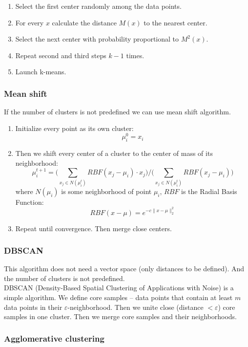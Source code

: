 \begin{enumerate}
	\item Select the first center randomly among the data points.
	\item For every $x$ calculate the distance $M(x)$ to the nearest center.
	\item Select the next center with probability proportional to $M^2(x)$.
	\item Repeat second and third steps $k-1$ times.
	\item Launch k-means.
\end{enumerate}

\subsubsection{Mean shift}

If the number of clusters is not predefined we can use mean shift algorithm.
\begin{enumerate}
	\item Initialize every point as its own cluster: $$\mu_i^0=x_i$$
	\item Then we shift every center of a cluster to the center of mass of its neighborhood: $$\mu_i^{t+1}=\Big(\sum\limits_{x_j\in N(\mu_i^t)}RBF(x_j-\mu_i)\cdot x_j\Big)/\Big(\sum\limits_{x_j\in N(\mu_i^t)}RBF(x_j-\mu_i)\Big)$$ where $N(\mu_i)$ is some neighborhood of point $\mu_i$, $RBF$ is the Radial Basis Function: $$RBF(x-\mu)=e^{-c\|x-\mu\|_2^2}$$
	\item Repeat until convergence. Then merge close centers.
\end{enumerate}

\subsubsection*{DBSCAN}

This algorithm does not need a vector space (only distances to be defined). And the number of clusters is not predefined.\\
DBSCAN (Density-Based Spatial Clustering of Applications with Noise) is a simple algorithm. We define core samples -- data points that contain at least $m$ data points in their $\varepsilon$-neighborhood. Then we unite close (distance $<\varepsilon$) core samples in one cluster. Then we merge core samples and their neighborhoods.

\subsubsection*{Agglomerative clustering}

